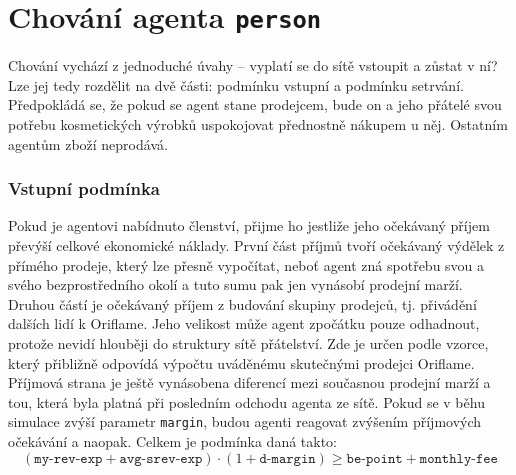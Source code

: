 \documentclass[a4wide,12pt]{report}
\begin{document}
\section{Chování agenta \texttt{person}}
Chování vychází z jednoduché úvahy -- vyplatí se do sítě vstoupit a zůstat v ní? Lze jej tedy rozdělit na dvě části: podmínku vstupní a podmínku setrvání. Předpokládá se, že pokud se agent stane prodejcem, bude on a jeho přátelé svou potřebu kosmetických výrobků uspokojovat přednostně nákupem u něj. Ostatním agentům zboží neprodává.
\subsubsection{Vstupní podmínka}
Pokud je agentovi nabídnuto členství, přijme ho jestliže jeho očekávaný příjem převýší celkové ekonomické náklady. První část příjmů tvoří očekávaný výdělek z přímého prodeje, který lze přesně vypočítat, neboť agent zná spotřebu svou a svého bezprostředního okolí a tuto sumu pak jen vynásobí prodejní marží. Druhou částí je očekávaný příjem z budování skupiny prodejců, tj. přivádění dalších lidí k Oriflame. Jeho velikost může agent zpočátku pouze odhadnout, protože nevidí hlouběji do struktury sítě přátelství. Zde je určen podle vzorce, který přibližně odpovídá výpočtu uváděnému skutečnými prodejci Oriflame. Příjmová strana je ještě vynásobena diferencí mezi současnou prodejní marží a tou, která byla platná při posledním odchodu agenta ze sítě. Pokud se v běhu simulace zvýší parametr \texttt{margin}, budou agenti reagovat zvýšením příjmových očekávání a naopak. Celkem je podmínka daná takto:
\[(\texttt{my-rev-exp} + \texttt{avg-srev-exp}) \cdot (1+\texttt{d-margin}) \geq \texttt{be-point} + \texttt{monthly-fee}\]
\end{document}
